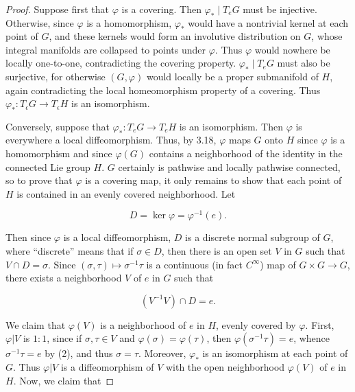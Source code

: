 \begin{proof}
Suppose first that $\varphi$ is a covering. Then $\varphi_{*}\mid T_{e} G$ must be injective. Otherwise, since $\varphi$ is a homomorphism, $\varphi_{*}$ would have a nontrivial kernel at each point of $G$, and these kernels would form an involutive distribution on $G$, whose integral manifolds are collapsed to points under $\varphi$. Thus $\varphi$ would nowhere be locally one-to-one, contradicting the covering property. $\varphi_{*}\mid T_{e} G$ must also be surjective, for otherwise $(G,\varphi)$ would locally be a proper submanifold of $H$, again contradicting the local homeomorphism property of a covering. Thus $\varphi_{*}:T_{\epsilon} G\to T_{\epsilon} H$ is an isomorphism.

Conversely, suppose that $\varphi_{*}:T_{e} G\to T_{e} H$ is an isomorphism. Then $\varphi$ is everywhere a local diffeomorphism. Thus, by 3.18, $\varphi$ maps $G$ onto $H$ since $\varphi$ is a homomorphism and since $\varphi(G)$ contains a neighborhood of the identity in the connected Lie group $H$. $G$ certainly is pathwise and locally pathwise connected, so to prove that $\varphi$ is a covering map, it only remains to show that each point of $H$ is contained in an evenly covered neighborhood. Let

\begin{equation}
\tag{1}\label{eq:3.26:1}
D=\ker\varphi=\varphi^{-1}(e).
\end{equation}

Then since $\varphi$ is a local diffeomorphism, $D$ is a discrete normal subgroup of $G$, where “discrete” means that if $\sigma \in D$, then there is an open set $V$ in $G$ such that $V \cap D = \sigma$. Since $(\sigma, \tau) \mapsto \sigma^{-1} \tau$ is a continuous (in fact $C^\infty$) map of $G \times G \to G$, there exists a neighborhood $V$ of $e$ in $G$ such that

\begin{equation}
\tag{2}\label{eq:3.26:2}
(V^{-1}V)\cap D=e.
\end{equation}

We claim that $\varphi(V)$ is a neighborhood of $e$ in $H$, evenly covered by $\varphi$. First, $\varphi\big|V$ is $1:1$, since if $\sigma,\tau\in V$ and $\varphi(\sigma)=\varphi(\tau)$, then $\varphi(\sigma^{-1}\tau)=e$, whence $\sigma^{-1}\tau=e$ by (2), and thus $\sigma=\tau$. Moreover, $\varphi_{*}$ is an isomorphism at each point of $G$. Thus $\varphi\big|V$ is a diffeomorphism of $V$ with the open neighborhood $\varphi(V)$ of $e$ in $H$. Now, we claim that


\end{proof}
